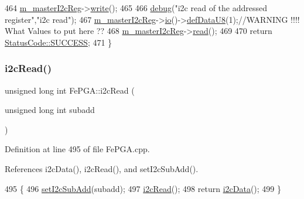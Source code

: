\begin{DoxyCode}
464   \hyperlink{classFePGA_adb390ea8de4a6cbce648dc62e4405f32}{m\_masterI2cReg}->\hyperlink{classIOobject_a9f6984bc9f0fadcf800f1be2523ac744}{write}();
465 
466   \hyperlink{classObject_aac010553f022165573714b7014a15f0d}{debug}(\textcolor{stringliteral}{"i2c read of the addressed register"},\textcolor{stringliteral}{"i2c read"});
467   \hyperlink{classFePGA_adb390ea8de4a6cbce648dc62e4405f32}{m\_masterI2cReg}->\hyperlink{classIOobject_af04fb94137c3d86849f478ac5afab5d1}{io}()->\hyperlink{classIOdata_a80bb230b61062b447db5832e43bf7b44}{defDataU8}(1);\textcolor{comment}{//WARNING !!!! What Values to put here ??}
468   \hyperlink{classFePGA_adb390ea8de4a6cbce648dc62e4405f32}{m\_masterI2cReg}->\hyperlink{classIOobject_aa07610c11963b1db6710e3c76ceea456}{read}();
469 
470   \textcolor{keywordflow}{return} \hyperlink{classStatusCode_a6f565cbeadc76d14c72f047e5e85eb4badd0da38d3ba0d922efd1f4619bc37ad8}{StatusCode::SUCCESS};
471 \}
\end{DoxyCode}
\mbox{\label{classFePGA_adf1c43786131d0f500b4662a877229c7}} 
\subsubsection{\texorpdfstring{i2c\+Read()}{i2cRead()}\hspace{0.1cm}{\footnotesize\ttfamily [2/2]}}
{\footnotesize\ttfamily unsigned long int Fe\+P\+G\+A\+::i2c\+Read (\begin{DoxyParamCaption}\item[{unsigned long int}]{subadd }\end{DoxyParamCaption})}



Definition at line 495 of file Fe\+P\+G\+A.\+cpp.



References i2c\+Data(), i2c\+Read(), and set\+I2c\+Sub\+Add().


\begin{DoxyCode}
495                                                         \{
496   \hyperlink{classFePGA_a37c1ee5bf89667c641f321479697166f}{setI2cSubAdd}(subadd);
497   \hyperlink{classFePGA_a939c5c23077210a2ad851a12694657a4}{i2cRead}();
498   \textcolor{keywordflow}{return} \hyperlink{classFePGA_a9c261a09d323c07ec4b9e925d4dfc353}{i2cData}();
499 \}
\end{DoxyCode}
\mbox{\label{classFePGA_ab51ac1c71e33f7444212de0e89e1f436}} 
